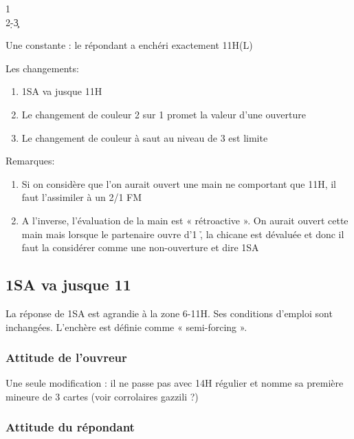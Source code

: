 \documentclass[a4paper]{article}
\begin{document}
\begin{bidtable}
1\c\\
2\d-3\c
\end{bidtable}

Une constante : le répondant a enchéri exactement 11H(L)

Les changements:

\begin{enumerate}
\item 1SA va jusque 11H

\item Le changement de couleur 2 sur 1 promet la valeur d’une ouverture

\item Le changement de couleur à saut au niveau de 3 est limite

\end{enumerate}

Remarques:

\begin{enumerate}
\item Si on considère que l’on aurait ouvert une main ne comportant que 11H, il faut 
l’assimiler à un 2/1 FM

\item A l’inverse, l’évaluation de la main est « rétroactive ». On aurait ouvert cette main 
mais lorsque le partenaire ouvre d’1 \h , la chicane est dévaluée et donc il faut la 
considérer comme une non-ouverture et dire 1SA

\end{enumerate}

\subsection{1SA va jusque 11}

La réponse de 1SA est agrandie à la zone 6-11H. 
Ses conditions d’emploi sont inchangées. 
L’enchère est définie comme « semi-forcing ».

\subsubsection{Attitude de l'ouvreur}

Une seule modification : il ne passe pas avec 14H régulier et nomme sa 
première mineure de 3 cartes (voir corrolaires gazzili ?)

\subsubsection{Attitude du répondant}
\end{document}
